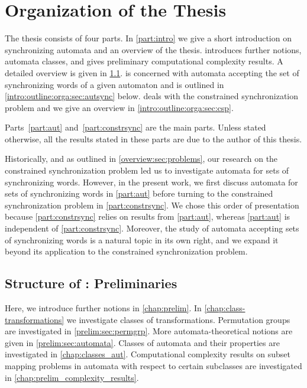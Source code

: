 \section{Organization of the Thesis}
\label{overview:sec:organization}

The thesis consists of four parts.
In \cref{part:intro} we give a short introduction on synchronizing automata
and an overview of the thesis.
 introduces further notions, automata classes,
and gives preliminary computational complexity results.
A detailed overview is given in \cref{intro:outline:orga:sec:prelim}.
 is concerned with automata accepting the set of synchronizing words of a given automaton and is outlined in \cref{intro:outline:orga:sec:autsync} below.
 deals with the constrained synchronization problem
and we give an overview in \cref{intro:outline:orga:sec:csp}.

Parts~\ref{part:aut} and~\ref{part:constrsync} are the main parts.
Unless stated otherwise, all the results stated in these 
parts are due to the author of this thesis.

Historically, and as outlined in \cref{overview:sec:problems}, 
our research on the constrained synchronization problem
led us to investigate automata for sets of synchronizing words.
However, in the present work, we first discuss automata for sets of synchronizing words in \cref{part:aut} before turning to the constrained synchronization problem in \cref{part:constrsync}.
We chose this order of presentation because \cref{part:constrsync} relies on results from \cref{part:aut}, whereas \cref{part:aut} is independent of \cref{part:constrsync}.
Moreover, the study of automata accepting sets of synchronizing words is a natural topic in its own right, 
and we expand it beyond its application to the constrained synchronization problem.

\subsection{Structure of : Preliminaries}
\label{intro:outline:orga:sec:prelim}

Here, we introduce further notions in \cref{chap:prelim}. 
In \cref{chap:class-transformations} we investigate classes of transformations.
Permutation groups are investigated in \cref{prelim:sec:permgrp}.
More automata-theoretical notions are given in \cref{prelim:sec:automata}. 
Classes of automata and their properties
are investigated in \cref{chap:classes_aut}.
Computational complexity results on subset mapping problems
in automata with respect to certain subclasses 
are investigated in \cref{chap:prelim_complexity_results}.


